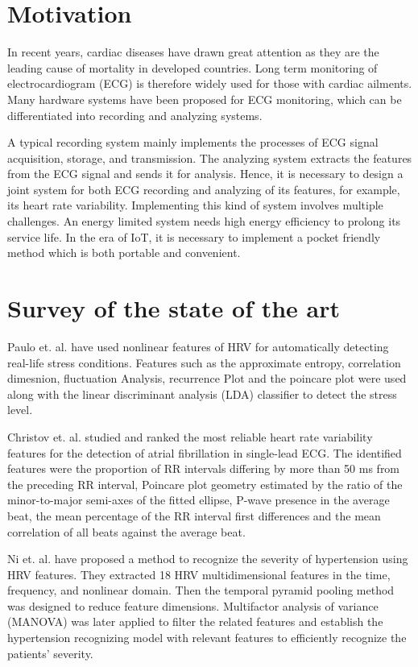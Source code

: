 \documentclass[11pt]{article}
\theoremstyle{definition}
\begin{document}
  \section{Motivation}
  In recent years, cardiac diseases have drawn great attention as they are the leading cause of mortality in developed countries.
  Long term monitoring of electrocardiogram (ECG) is therefore widely used for those with cardiac ailments.
  Many hardware systems have been proposed for ECG monitoring, which can be differentiated into recording and analyzing systems.

  A typical recording system mainly implements the processes of ECG signal acquisition, storage, and transmission.
  The analyzing system extracts the features from the ECG signal and sends it for analysis.
  Hence, it is necessary to design a joint system for both ECG recording and analyzing of its features, for example, its heart rate variability. Implementing this kind of system involves multiple challenges.
  An energy limited system needs high energy efficiency to prolong its service life.
  In the era of IoT, it is necessary to implement a pocket friendly method which is both portable and convenient.


  \section{Survey of the state of the art}
  Paulo et. al.\cite{melillo2011nonlinear} have used nonlinear features of HRV for automatically detecting real-life stress conditions. Features such as the approximate entropy, correlation dimesnion, fluctuation Analysis, recurrence Plot and the poincare plot were used along with the linear discriminant analysis (LDA) classifier to detect the stress level.

  Christov et. al. \cite{christov2018ranking} studied and ranked the most reliable heart rate variability features for the detection of atrial fibrillation in single-lead ECG. The identified features were the proportion of RR intervals differing by more than 50 ms from the preceding RR interval, Poincare plot geometry estimated by the ratio of the minor-to-major semi-axes of the fitted ellipse, P-wave presence in the average beat, the mean percentage of the RR interval first differences and the mean correlation of all beats against the average beat.

  Ni et. al.\cite{ni2019multiscale} have proposed a method to recognize the severity of hypertension using HRV features. They extracted 18 HRV multidimensional features in the time, frequency, and nonlinear domain. Then the temporal pyramid pooling method was designed to reduce feature dimensions. Multifactor analysis of variance (MANOVA) was later applied to filter the related features and establish the hypertension recognizing model with relevant features to efficiently recognize the patients’ severity.
\end{document}
